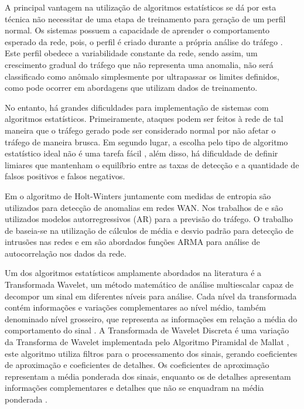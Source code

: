\indent A principal vantagem na utilização de algoritmos estatísticos se dá por esta técnica não necessitar de uma etapa de treinamento para geração de um perfil normal. Os sistemas possuem a capacidade de aprender o comportamento esperado da rede, pois, o perfil é criado durante a própria análise do tráfego \cite{Teodoro2009}. Este perfil obedece a variabilidade constante da rede, sendo assim, um crescimento gradual do tráfego que não representa uma anomalia, não será classificado como anômalo simplesmente por ultrapassar os limites definidos, como pode ocorrer em abordagens que utilizam dados de treinamento.

\indent No entanto, há grandes dificuldades para implementação de sistemas com algoritmos estatísticos. Primeiramente, ataques podem ser feitos à rede de tal maneira que o tráfego gerado pode ser considerado normal por não afetar o tráfego de maneira brusca. Em segundo lugar, a escolha pelo tipo de algoritmo estatístico ideal não é uma tarefa fácil \cite{Bhuyan}, além disso, há dificuldade de definir limiares que mantenham o equilíbrio entre as taxas de detecção e a quantidade de falsos positivos e falsos negativos.

\indent Em  o algoritmo de Holt-Winters juntamente com medidas de entropia são utilizados para detecção de anomalias em redes WAN. Nos trabalhos de  e  são utilizados modelos autorregressivos (AR) para a previsão do tráfego. O trabalho de  baseia-se na utilização de cálculos de média e desvio padrão para detecção de intrusões nas redes e em  são abordados funções ARMA para análise de autocorrelação nos dados da rede.

\indent Um dos algoritmos estatísticos amplamente abordados na literatura é a Transformada Wavelet, um método matemático de análise multiescalar capaz de decompor um sinal em diferentes níveis para análise. Cada nível da transformada contém informações e variações complementares ao nível médio, também denominado nível grosseiro, que representa as informações em relação a média do comportamento do sinal \cite{perlin2011}. A Transformada de Wavelet Discreta é uma variação da Transforma de Wavelet implementada pelo Algoritmo Piramidal de Mallat \cite{mallat1998}, este algoritmo utiliza filtros para o processamento dos sinais, gerando coeficientes de aproximação e coeficientes de detalhes. Os coeficientes de aproximação representam a média ponderada dos sinais, enquanto os de detalhes apresentam informações complementares e detalhes que não se enquadram na média ponderada \cite{Righi2014}.

